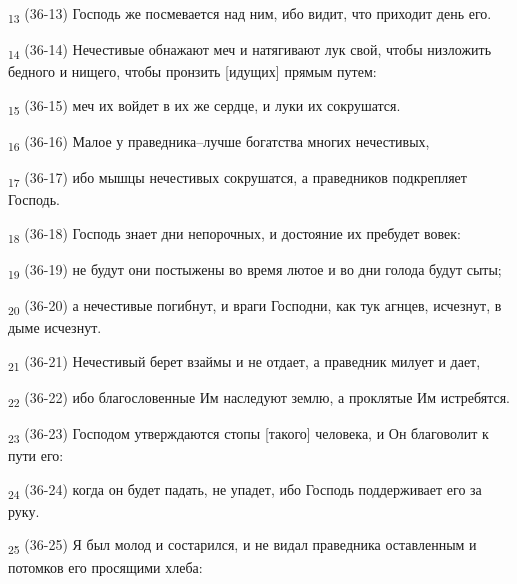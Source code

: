 \begin{tcolorbox}
\textsubscript{13} (36-13) Господь же посмевается над ним, ибо видит, что приходит день его.
\end{tcolorbox}
\begin{tcolorbox}
\textsubscript{14} (36-14) Нечестивые обнажают меч и натягивают лук свой, чтобы низложить бедного и нищего, чтобы пронзить [идущих] прямым путем:
\end{tcolorbox}
\begin{tcolorbox}
\textsubscript{15} (36-15) меч их войдет в их же сердце, и луки их сокрушатся.
\end{tcolorbox}
\begin{tcolorbox}
\textsubscript{16} (36-16) Малое у праведника--лучше богатства многих нечестивых,
\end{tcolorbox}
\begin{tcolorbox}
\textsubscript{17} (36-17) ибо мышцы нечестивых сокрушатся, а праведников подкрепляет Господь.
\end{tcolorbox}
\begin{tcolorbox}
\textsubscript{18} (36-18) Господь знает дни непорочных, и достояние их пребудет вовек:
\end{tcolorbox}
\begin{tcolorbox}
\textsubscript{19} (36-19) не будут они постыжены во время лютое и во дни голода будут сыты;
\end{tcolorbox}
\begin{tcolorbox}
\textsubscript{20} (36-20) а нечестивые погибнут, и враги Господни, как тук агнцев, исчезнут, в дыме исчезнут.
\end{tcolorbox}
\begin{tcolorbox}
\textsubscript{21} (36-21) Нечестивый берет взаймы и не отдает, а праведник милует и дает,
\end{tcolorbox}
\begin{tcolorbox}
\textsubscript{22} (36-22) ибо благословенные Им наследуют землю, а проклятые Им истребятся.
\end{tcolorbox}
\begin{tcolorbox}
\textsubscript{23} (36-23) Господом утверждаются стопы [такого] человека, и Он благоволит к пути его:
\end{tcolorbox}
\begin{tcolorbox}
\textsubscript{24} (36-24) когда он будет падать, не упадет, ибо Господь поддерживает его за руку.
\end{tcolorbox}
\begin{tcolorbox}
\textsubscript{25} (36-25) Я был молод и состарился, и не видал праведника оставленным и потомков его просящими хлеба:
\end{tcolorbox}
